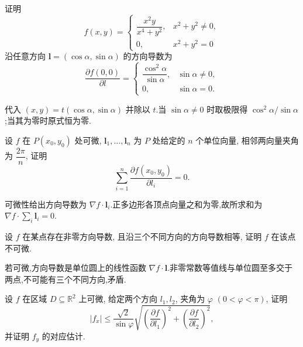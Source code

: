 \begin{example}
    证明
    \[
        f(x,y)=
        \begin{cases}
            \dfrac{x^2y}{x^4+y^2}, & x^2+y^2\ne0, \\
            0,                     & x^2+y^2=0
        \end{cases}
    \]
    沿任意方向 $\bm l=(\cos\alpha,\sin\alpha)$ 的方向导数为
    \[
        \dfrac{\partial f(0,0)}{\partial l}
        =\begin{cases}
            \dfrac{\cos^2\alpha}{\sin\alpha}, & \sin\alpha\ne0, \\
            0,                                & \sin\alpha=0.
        \end{cases}
    \]
\end{example}
\exampleblank

\begin{solution}
    代入 $(x,y)=t(\cos\alpha,\sin\alpha)$ 并除以 $t$.当 $\sin\alpha\ne0$ 时取极限得 $\cos^2\alpha/\sin\alpha$;当其为零时原式恒为零.
\end{solution}

\begin{example}
    设 $f$ 在 $P(x_0,y_0)$ 处可微, $\bm l_1,\ldots,\bm l_n$ 为 $P$ 处给定的 $n$ 个单位向量, 相邻两向量夹角为 $\dfrac{2\pi}{n}$, 证明
    \[
        \sum\limits_{i=1}^n\dfrac{\partial f(x_0,y_0)}{\partial l_i}=0.
    \]
\end{example}
\exampleblank

\begin{solution}
    可微性给出方向导数为 $\nabla f\cdot\bm l_i$.正多边形各顶点向量之和为零,故所求和为 $\nabla f\cdot\sum_i\bm l_i=0$.
\end{solution}

\begin{example}
    设 $f$ 在某点存在非零方向导数, 且沿三个不同方向的方向导数相等, 证明 $f$ 在该点不可微.
\end{example}
\exampleblank

\begin{solution}
    若可微,方向导数是单位圆上的线性函数 $\nabla f\cdot\bm l$.非零常数等值线与单位圆至多交于两点,不可能有三个不同方向,矛盾.
\end{solution}

\begin{example}
    设 $f$ 在区域 $D\subseteq\mathbb{R}^2$ 上可微, 给定两个方向 $l_1,l_2$, 夹角为 $\varphi$ $(0<\varphi<\pi)$, 证明
    \[
        |f_x|\leq\dfrac{\sqrt2}{\sin\varphi}
        \sqrt{\left(\dfrac{\partial f}{\partial l_1}\right)^2+
            \left(\dfrac{\partial f}{\partial l_2}\right)^2},
    \]
    并证明 $f_y$ 的对应估计.
\end{example}
\exampleblank

